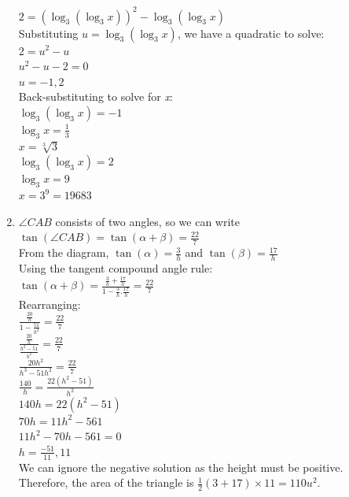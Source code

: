 \documentclass[../main.tex]{subfiles}
\begin{document}
\begin{enumerate}
    \(2=(\log_3 (\log_3 x))^2-\log_3 (\log_3 x)\)\\

    Substituting \(u=\log_3 (\log_3 x)\), we have a quadratic to solve:\\

    \(2=u^2-u\)\\
    \(u^2-u-2=0\)\\
    \(u=-1, 2\)\\

    Back-substituting to solve for \textit{x}:\\
    \(\log_3 (\log_3 x)=-1\)\\
    \(\log_3 x=\frac{1}{3}\)\\
    \(x=\sqrt[3]{3}\)\\
    \(\log_3 (\log_3 x)=2\)\\
    \(\log_3 x=9\)\\
    \(x=3^9=19683\)\\
    
    \item 
    \(\angle CAB\) consists of two angles, so we can write \(\tan{(\angle CAB)}=\tan{(\alpha + \beta)}=\frac{22}{7}\)\\
    From the diagram, \(\tan{(\alpha)}=\frac{3}{h}\) and \(\tan{(\beta)}=\frac{17}{h}\)\\

    Using the tangent compound angle rule:\\
    \(\tan{(\alpha + \beta)}=\frac{\frac{3}{h}+\frac{17}{h}}{1-\frac{3}{h}.\frac{17}{h}}=\frac{22}{7}\)\\

    Rearranging:\\
    \(\frac{\frac{20}{h}}{1-\frac{51}{h^2}}=\frac{22}{7}\)\\

    \(\frac{\frac{20}{h}}{\frac{h^2-51}{h^2}}=\frac{22}{7}\)\\

    \(\frac{20h^2}{h^3-51h^2}=\frac{22}{7}\)\\

    \(\frac{140}{h}=\frac{22(h^2-51)}{h^2}\)\\

    \(140h=22(h^2-51)\)\\

    \(70h=11h^2-561\)\\

    \(11h^2-70h-561=0\)\\
    \(h=\frac{-51}{11}, 11\)\\

    We can ignore the negative solution as the height must be positive.\\
    Therefore, the area of the triangle is \(\frac{1}{2}(3+17)\times 11=110u^2\).
    \end{enumerate}
\end{document}
